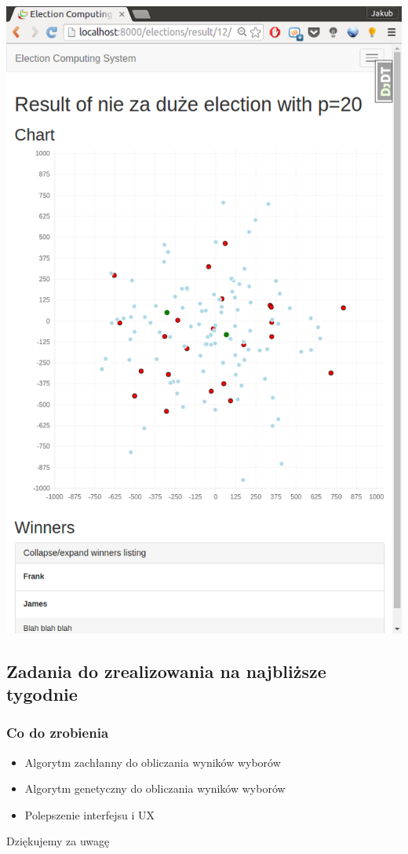 \documentclass{beamer}
\begin{document}
\begin{frame}
\begin{center}
\includegraphics[height=\paperheight]{screenshots/election_results}
\end{center}
\end{frame}



\subsection{Zadania do zrealizowania na najbliższe tygodnie}

\begin{frame}

\frametitle{Co do zrobienia}
\begin{itemize}
\item Algorytm zachłanny do obliczania wyników wyborów	
\item Algorytm genetyczny do obliczania wyników wyborów
\item Polepszenie interfejsu i UX
\end{itemize}

\end{frame}




\begin{frame}
\Huge{\centerline{Dziękujemy za uwagę}}
\end{frame}
\end{document}
